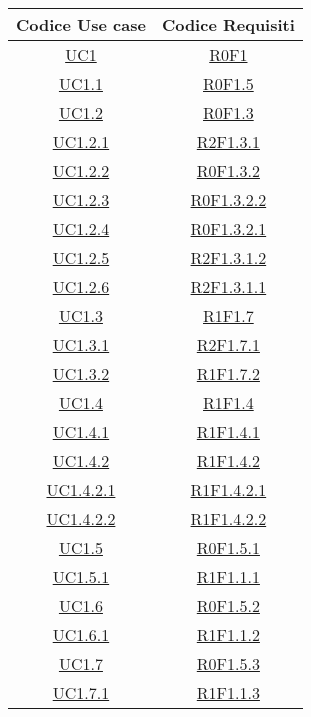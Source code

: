 \begin{longtable}{|c|c|}
\hline
\textbf{Codice Use case} & \textbf{Codice Requisiti} \\
\hline
\endhead
\hyperlink{UC1}{UC1} & \hyperlink{R0F1}{R0F1}\\
\hline
\hyperlink{UC1.1}{UC1.1} & \hyperlink{R0F1.5}{R0F1.5}\\
\hline
\hyperlink{UC1.2}{UC1.2} & \hyperlink{R0F1.3}{R0F1.3}\\
\hline
\hyperlink{UC1.2.1}{UC1.2.1} & \hyperlink{R2F1.3.1}{R2F1.3.1}\\
\hline
\hyperlink{UC1.2.2}{UC1.2.2} & \hyperlink{R0F1.3.2}{R0F1.3.2}\\
\hline
\hyperlink{UC1.2.3}{UC1.2.3} & \hyperlink{R0F1.3.2.2}{R0F1.3.2.2}\\
\hline
\hyperlink{UC1.2.4}{UC1.2.4} & \hyperlink{R0F1.3.2.1}{R0F1.3.2.1}\\
\hline
\hyperlink{UC1.2.5}{UC1.2.5} & \hyperlink{R2F1.3.1.2}{R2F1.3.1.2}\\
\hline
\hyperlink{UC1.2.6}{UC1.2.6} & \hyperlink{R2F1.3.1.1}{R2F1.3.1.1}\\
\hline
\hyperlink{UC1.3}{UC1.3} & \hyperlink{R1F1.7}{R1F1.7}\\
\hline
\hyperlink{UC1.3.1}{UC1.3.1} & \hyperlink{R2F1.7.1}{R2F1.7.1}\\
\hline
\hyperlink{UC1.3.2}{UC1.3.2} & \hyperlink{R1F1.7.2}{R1F1.7.2}\\
\hline
\hyperlink{UC1.4}{UC1.4} & \hyperlink{R1F1.4}{R1F1.4}\\
\hline
\hyperlink{UC1.4.1}{UC1.4.1} & \hyperlink{R1F1.4.1}{R1F1.4.1}\\
\hline
\hyperlink{UC1.4.2}{UC1.4.2} & \hyperlink{R1F1.4.2}{R1F1.4.2}\\
\hline
\hyperlink{UC1.4.2.1}{UC1.4.2.1} & \hyperlink{R1F1.4.2.1}{R1F1.4.2.1}\\
\hline
\hyperlink{UC1.4.2.2}{UC1.4.2.2} & \hyperlink{R1F1.4.2.2}{R1F1.4.2.2}\\
\hline
\hyperlink{UC1.5}{UC1.5} & \hyperlink{R0F1.5.1}{R0F1.5.1}\\
\hline
\hyperlink{UC1.5.1}{UC1.5.1} & \hyperlink{R1F1.1.1}{R1F1.1.1}\\
\hline
\hyperlink{UC1.6}{UC1.6} & \hyperlink{R0F1.5.2}{R0F1.5.2}\\
\hline
\hyperlink{UC1.6.1}{UC1.6.1} & \hyperlink{R1F1.1.2}{R1F1.1.2}\\
\hline
\hyperlink{UC1.7}{UC1.7} & \hyperlink{R0F1.5.3}{R0F1.5.3}\\
\hline
\hyperlink{UC1.7.1}{UC1.7.1} & \hyperlink{R1F1.1.3}{R1F1.1.3}\\

\end{longtable}
